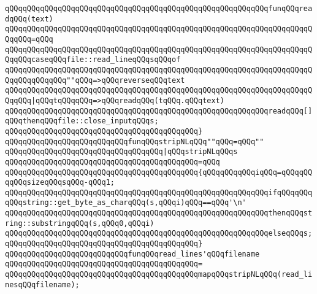 \verb|qQQqqQQqqQQqqQQqqQQqqQQqqQQqqQQqqQQqqQQqqQQqqQQqqQQqqQQqqQQqfunqQQqreadqQQq(text)|\newline
\verb|qQQqqQQqqQQqqQQqqQQqqQQqqQQqqQQqqQQqqQQqqQQqqQQqqQQqqQQqqQQqqQQqqQQqqQQqqQQq=qQQq|\newline
\verb|qQQqqQQqqQQqqQQqqQQqqQQqqQQqqQQqqQQqqQQqqQQqqQQqqQQqqQQqqQQqqQQqqQQqqQQqqQQqcaseqQQqfile::read_lineqQQqsqQQqof|\newline
\verb|qQQqqQQqqQQqqQQqqQQqqQQqqQQqqQQqqQQqqQQqqQQqqQQqqQQqqQQqqQQqqQQqqQQqqQQqqQQqqQQqqQQq""qQQq=>qQQqreverseqQQqtext|\newline
\verb|qQQqqQQqqQQqqQQqqQQqqQQqqQQqqQQqqQQqqQQqqQQqqQQqqQQqqQQqqQQqqQQqqQQqqQQqqQQq|\verb#|qQQqtqQQqqQQq=>qQQqreadqQQq(tqQQq.qQQqtext)#\newline
\newline
\verb|qQQqqQQqqQQqqQQqqQQqqQQqqQQqqQQqqQQqqQQqqQQqqQQqqQQqqQQqqQQqreadqQQq[]qQQqthenqQQqfile::close_inputqQQqs;|\newline
\verb|qQQqqQQqqQQqqQQqqQQqqQQqqQQqqQQqqQQqqQQqqQQq}|\newline
\newline
\verb|qQQqqQQqqQQqqQQqqQQqqQQqqQQqfunqQQqstripNLqQQq""qQQq=qQQq""|\newline
\verb|qQQqqQQqqQQqqQQqqQQqqQQqqQQqqQQqqQQq|\verb#|qQQqstripNLqQQqs#\newline
\verb|qQQqqQQqqQQqqQQqqQQqqQQqqQQqqQQqqQQqqQQqqQQq=qQQq|\newline
\verb|qQQqqQQqqQQqqQQqqQQqqQQqqQQqqQQqqQQqqQQqqQQq{qQQqqQQqqQQqiqQQq=qQQqqQQqqQQqsizeqQQqsqQQq-qQQq1;|\newline
\newline
\verb|qQQqqQQqqQQqqQQqqQQqqQQqqQQqqQQqqQQqqQQqqQQqqQQqqQQqqQQqqQQqifqQQqqQQqqQQqstring::get_byte_as_charqQQq(s,qQQqi)qQQq==qQQq'\n'|\newline
\verb|qQQqqQQqqQQqqQQqqQQqqQQqqQQqqQQqqQQqqQQqqQQqqQQqqQQqqQQqqQQqthenqQQqstring::substringqQQq(s,qQQq0,qQQqi)|\newline
\verb|qQQqqQQqqQQqqQQqqQQqqQQqqQQqqQQqqQQqqQQqqQQqqQQqqQQqqQQqqQQqelseqQQqs;|\newline
\verb|qQQqqQQqqQQqqQQqqQQqqQQqqQQqqQQqqQQqqQQqqQQq}|\newline
\newline
\verb|qQQqqQQqqQQqqQQqqQQqqQQqqQQqfunqQQqread_lines'qQQqfilename|\newline
\verb|qQQqqQQqqQQqqQQqqQQqqQQqqQQqqQQqqQQqqQQqqQQq=|\newline
\verb|qQQqqQQqqQQqqQQqqQQqqQQqqQQqqQQqqQQqqQQqqQQqmapqQQqstripNLqQQq(read_linesqQQqfilename);|\newline
